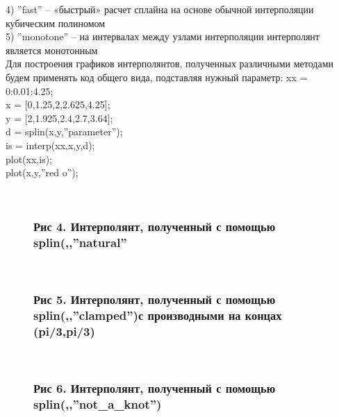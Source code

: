 \documentclass[russian,utf8,nocolumnxxxi,nocolumnxxxii]{eskdtext}
\begin{document}
4) ”fast” – «быстрый» расчет сплайна на основе обычной интерполяции кубическим полиномом\\
5) ”monotone” – на интервалах между узлами интерполяции интерполянт является монотонным\\
Для построения графиков интерполянтов, полученных различными методами будем применять код общего вида, подставляя нужный параметр:
xx = 0:0.01:4.25;\\
x = [0,1.25,2,2.625,4.25];\\
y = [2,1.925,2.4,2.7,3.64];\\
d = splin(x,y,”parameter”);\\
is = interp(xx,x,y,d);\\
plot(xx,is);\\
plot(x,y,”red o”);\\

\newpage
\begin{figure}[H]
\begin{center}
\begin{minipage}[h]{0.70\linewidth}
  \\
\frametitle{Рис 4. Интерполянт, полученный с помощью splin(,,”natural”}
\end{minipage}
\end{center}
\end{figure}

\begin{figure}[H]
\begin{center}
\begin{minipage}[h]{0.70\linewidth}
  \\
\frametitle{Рис 5. Интерполянт, полученный с помощью splin(,,”clamped”)с производными на концах (pi/3,pi/3)}
\end{minipage}
\end{center}
\end{figure}

\begin{figure}[H]
\begin{center}
\begin{minipage}[h]{0.70\linewidth}
  \\
\frametitle{Рис 6. Интерполянт, полученный с помощью splin(,,”not_a_knot”)}
\end{minipage}
\end{center}
\end{figure}
\newpage
\end{document}
